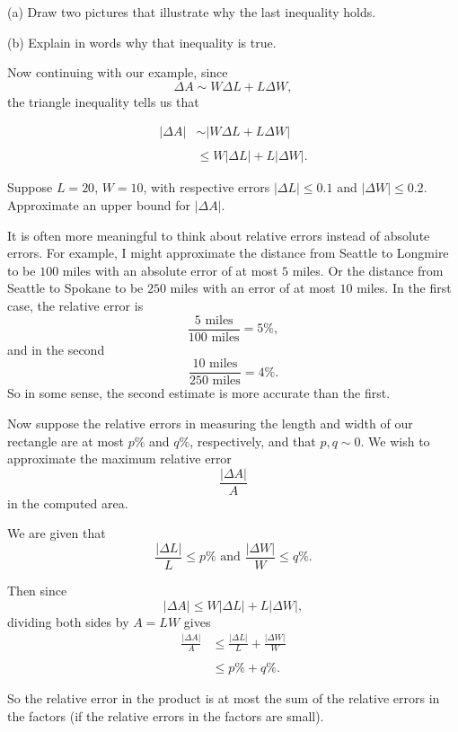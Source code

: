 \documentclass{ximera}
\begin{document}
\begin{example}
\begin{explanation}
\begin{question}  \label{Qdgbbhu7}
(a) Draw two pictures that illustrate why the last inequality holds. 

(b) Explain in words why that inequality is true.
\end{question}

Now continuing with our example, since
\[
  \Delta A \sim W\Delta L + L \Delta W ,
\]
the triangle inequality tells us that

\begin{align*}
    | \Delta A |  &\sim |   W\Delta L +  L \Delta W | \\ \\
                      & \leq W|\Delta L| + L |\Delta W| .
\end{align*}

\begin{question}  \label{Q34gnyyt}
 Suppose $L=20$, $W=10$, with respective errors $|\Delta L| \leq  0.1$ and $|\Delta W| \leq  0.2$. Approximate an upper bound for $|\Delta A|$.
\end{question}


It is often more meaningful to think about relative errors instead of absolute errors. For example, I might approximate the distance from Seattle to Longmire to be $100$ miles with an absolute error of at most $5$ miles. Or the distance from Seattle to Spokane to be $250$ miles with an error of at most $10$ miles. In the first case, the relative error is
\[
          \frac{5 \text{ miles}}{100 \text{ miles}} = 5\% ,
\]
and in the second
\[
          \frac{10\text{ miles}}{250 \text{ miles}} = 4\% .
\]
So in some sense, the second estimate is more accurate than the first.


Now suppose the relative errors in measuring the length and width of our rectangle are at most $p\%$ and $q\%$, respectively, and that $p,q \sim 0$.  We wish to approximate the maximum relative error
\[
      \frac{|\Delta A|}{A}
\]
in the computed area.

We are given that 
\[
      \frac{|\Delta L|}{L} \leq p\% \text{ and } \frac{|\Delta W|}{W} \leq q\% .
\]

Then since
\[
  | \Delta A | \leq W|\Delta L| + L |\Delta W| ,
\]
dividing both sides by $A = LW$ gives
\begin{align*}
      \frac{|\Delta A|}{A} & \leq \frac{|\Delta L|}{L} + \frac{|\Delta W|}{W} \\ \\
                                   & \leq p\% + q\% .
\end{align*}

So the relative error in the product is at most the sum of the relative errors in the factors (if the relative errors in the factors are small).

\end{explanation}

\end{example}
\end{document}
